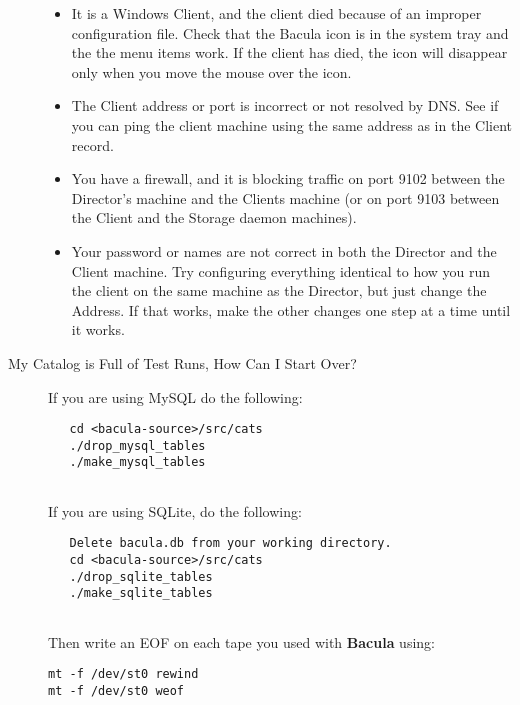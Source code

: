 \begin{description}
\begin{itemize}
\item It is a Windows Client, and the client died because of an  improper
   configuration file. Check that the Bacula icon is in  the system tray and the
   the menu items work. If the client has  died, the icon will disappear only
when you move the mouse over  the icon.  
\item The Client address or port is incorrect or not resolved by  DNS. See if
   you can ping the client machine using the same  address as in the Client
   record.  
\item You have a firewall, and it is blocking traffic on port  9102 between
   the Director's machine and the Clients  machine (or on port 9103 between the
   Client and the Storage daemon  machines).  
\item Your password or names are not correct in both the Director and  the
   Client machine. Try configuring everything identical to  how you run the
   client on the same machine as the Director, but  just change the Address. If
that works, make the other changes  one step at a time until it works.  
\end{itemize}

\label{startover}

\item [My Catalog is Full of Test Runs, How Can I Start Over? ]
  If you are using MySQL do the following:

\footnotesize
\begin{verbatim}
   cd <bacula-source>/src/cats
   ./drop_mysql_tables
   ./make_mysql_tables
 
\end{verbatim}
\normalsize

If you are using SQLite, do the following:

\footnotesize
\begin{verbatim}
   Delete bacula.db from your working directory.
   cd <bacula-source>/src/cats
   ./drop_sqlite_tables
   ./make_sqlite_tables
 
\end{verbatim}
\normalsize

Then write an EOF on each tape you used with {\bf Bacula} using: 

\footnotesize
\begin{verbatim}
mt -f /dev/st0 rewind
mt -f /dev/st0 weof
\end{verbatim}
\normalsize


\end{description}
